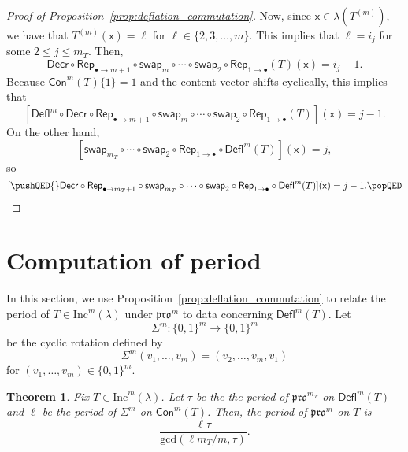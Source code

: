 \documentclass[12pt]{amsart}
\newcommand{\x}{\ensuremath{\mathsf{x}}}
\newtheorem{theorem}{Theorem}[section]
\theoremstyle{definition}
\theoremstyle{remark}
\numberwithin{equation}{section}
\newcommand{\inc}{\ensuremath{\mathrm{Inc}}}
\newcommand{\pro}{\mathfrak{pro}}
\newcommand{\swap}{\ensuremath{\mathsf{swap}}}
\newcommand{\decr}{\ensuremath{\mathsf{Decr}}}
\newcommand{\rep}{\ensuremath{\mathsf{Rep}}}
\newcommand{\deflate}{\ensuremath{\mathsf{Defl}}}
\newcommand{\content}{\ensuremath{\mathsf{Con}}}
\begin{document}
\begin{proof}[Proof of Proposition~\ref{prop:deflation_commutation}]
Now, since $\x \in \lambda(T^{(m)})$, we have that $T^{(m)}(\x) = \ell$ for $\ell \in \{2,3,\dots,m\}$. This implies that $\ell = i_j$ for some $2 \leq j \leq m_T$. Then, 
\[
\decr \circ \rep_{\bullet \to m+1} \circ \swap_m \circ \cdots \circ \swap_2 \circ \rep_{1 \rightarrow \bullet} (T)(\x) = i_j-1.
\]
Because $\content^m(T) \lbrace 1 \rbrace = 1$ and the content vector shifts cyclically, this implies that 
 \[
 [\deflate^m \circ \decr \circ \rep_{\bullet \rightarrow m+1} \circ \swap_m \circ \cdots \circ \swap_2 \circ \rep_{1 \rightarrow \bullet} (T)](\x) = j-1.
 \]
  On the other hand, 
  \[
  [\swap_{m_T} \circ \cdots \circ \swap_2 \circ \rep_{1 \rightarrow \bullet} \circ \deflate^m(T)](\x) = j,
  \]
   so 
   \[
   [ \pushQED{\qed} \decr \circ \rep_{\bullet \rightarrow m_T + 1} \circ \swap_{m_T} \circ \cdots \circ \swap_2 \circ \rep_{1 \rightarrow \bullet} \circ  \deflate^m(T)](\x) = j-1. \qedhere \popQED \] \let\qed\relax
\end{proof}

\section{Computation of period}\label{sec:period} In this section, we use Proposition~\ref{prop:deflation_commutation} to relate the period of $T \in \inc^m(\lambda)$ under $\pro^m$ to data concerning $\deflate^m(T)$. Let 
\[\Sigma^m : \lbrace 0,1\rbrace^m \rightarrow \lbrace 0,1\rbrace^m\]
 be the cyclic rotation defined by 
 \[
 \Sigma^m(v_1, \dots, v_m) = (v_2, \dots, v_m, v_1)
 \]
  for $(v_1, \dots, v_m) \in \lbrace 0,1 \rbrace^m$. 
  
\begin{theorem}\label{thm:periodthm}
Fix $T \in \inc^m(\lambda)$. Let $\tau$ be the the period of $\pro^{m_T}$ on $\deflate^m(T)$ and $\ell$ be the period of $\Sigma^m$ on $\content^m(T)$. Then, the period of $\pro^m$ on $T$ is \[\frac{\ell  \tau}{\mathrm{gcd}(\ell m_T / m,\tau)}. \]
\end{theorem} 
    
\end{document}
